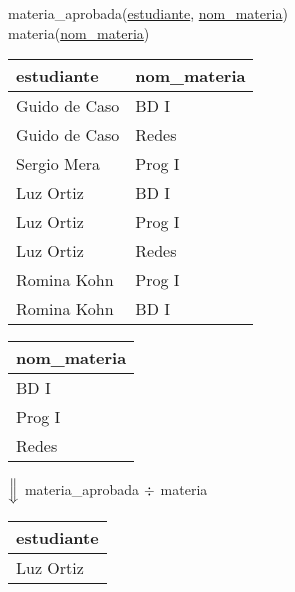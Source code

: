 \documentclass[preview]{standalone}
\begin{document}
materia\_aprobada(\underline{estudiante}, \underline{nom\_materia})\\
materia(\underline{nom\_materia})

\begin{center}
\begin{tabular}{ | l | l |}\hline
	estudiante & nom\_materia \\\hline			
	Guido de Caso & BD I  \\
	Guido de Caso & Redes  \\
	Sergio Mera & Prog I  \\
	Luz Ortiz & BD I  \\
	Luz Ortiz & Prog I  \\
	Luz Ortiz & Redes  \\
	Romina Kohn & Prog I  \\
	Romina Kohn & BD I  \\\hline
\end{tabular}
\quad
\begin{tabular}{| l |}\hline
	nom\_materia \\\hline			
	BD I \\
	Prog I \\
	Redes \\\hline
\end{tabular}
\vspace{.35cm}

$\Big\Downarrow$ materia\_aprobada ${\Large \div}$ materia
\vspace{.35cm}

\begin{tabular}{| l |}\hline
	estudiante \\\hline			
	Luz Ortiz \\\hline
\end{tabular}
\end{center}
\end{document}
